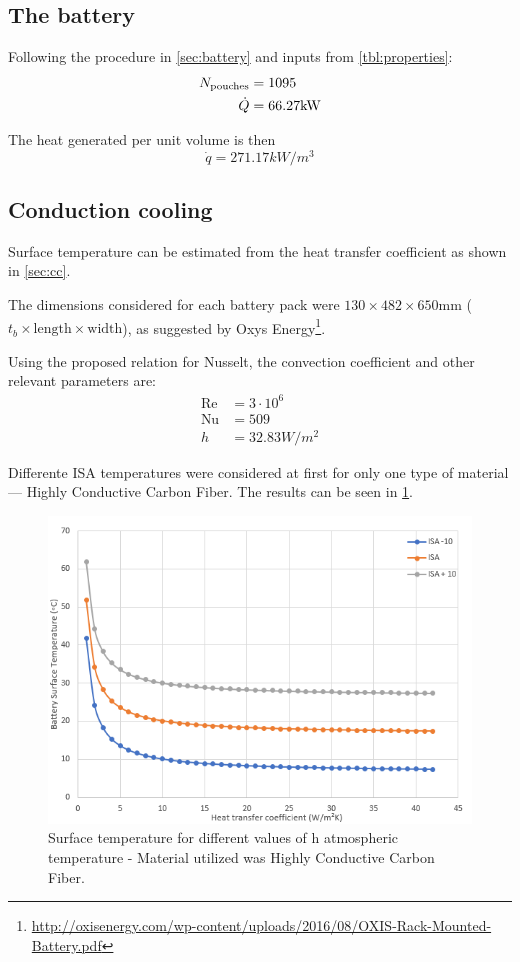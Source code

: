 \subsection{The battery}
Following the procedure in \cref{sec:battery} and inputs from \cref{tbl:properties}:
\begin{align}
    N_\text{pouches} &= 1095 \\ 
    \dot{Q} &= 66.27\si{kW} \notag
\end{align}

The heat generated per unit volume is then
\begin{equation}
    \dot{q} = 271.17\si{kW/m^3}
\end{equation}

\subsection{Conduction cooling}
\label{subsec:cc}

Surface temperature can be estimated from the heat transfer coefficient as shown in \cref{sec:cc}.

The dimensions considered for each battery pack were $130\times 482 \times 650 \text{mm}$ ($t_b\times\text{length} \times\text{width}$), as suggested by Oxys Energy\footnote{\url{http://oxisenergy.com/wp-content/uploads/2016/08/OXIS-Rack-Mounted-Battery.pdf}}. 

Using the proposed relation for Nusselt, the convection coefficient and other relevant parameters are:
\begin{align}
\text{Re} &= 3\cdot10^6 \\
\text{Nu} &= 509\\
h         &= 32.83\si{W/m^2}
\end{align}

Differente ISA temperatures were considered at first for only one type of material --- Highly Conductive Carbon Fiber. The results can be seen in \cref{fig:surfacetemp}.
\begin{figure}
    \centering
    \includegraphics[width=\textwidth]{fig/carbon-isa.png}
    \caption{Surface temperature for different values of h atmospheric temperature - Material utilized was Highly Conductive Carbon Fiber.}
    \label{fig:surfacetemp}
\end{figure}

